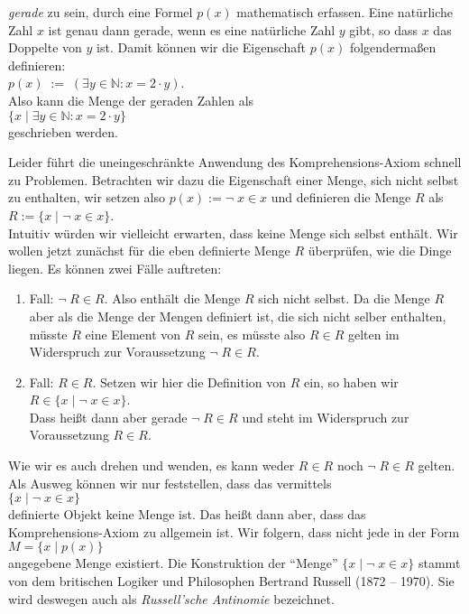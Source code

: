 \emph{gerade} zu sein, durch eine Formel $p(x)$ mathematisch erfassen.  Eine nat\"{u}rliche Zahl $x$ ist
genau dann gerade, wenn es eine nat\"{u}rliche Zahl $y$ gibt, so dass $x$ das Doppelte von $y$
ist.  Damit k\"{o}nnen wir die Eigenschaft $p(x)$ folgendermaßen
definieren: \\[0.2cm]
\hspace*{1.3cm} $p(x) \;:=\; (\exists y\in \mathbb{N}: x = 2 \cdot y)$. \\[0.2cm]
Also kann die Menge der geraden Zahlen als \\[0.2cm]
\hspace*{1.3cm} $\{ x \;|\; \exists y\in \mathbb{N}: x = 2 \cdot y \}$ \\[0.2cm]
geschrieben werden.

Leider f\"{u}hrt die uneingeschr\"{a}nkte Anwendung des Komprehensions-Axiom schnell zu
Problemen.  Betrachten wir dazu die Eigenschaft einer Menge, sich nicht selbst zu enthalten, wir
setzen also $p(x) := \neg\; x \in x$ und definieren die Menge $R$ als \\[0.2cm]
\hspace*{1.3cm} $R := \{ x \;|\; \neg\; x \in x \}$.  \\[0.2cm]
Intuitiv w\"{u}rden wir vielleicht erwarten, dass keine Menge sich selbst enth\"{a}lt.  Wir wollen
jetzt zun\"{a}chst f\"{u}r die eben definierte Menge $R$ \"{u}berpr\"{u}fen, wie die Dinge liegen.
Es k\"{o}nnen zwei F\"{a}lle auftreten:
\begin{enumerate}
\item Fall: $\neg\; R \in R$. Also enth\"{a}lt die Menge $R$ sich nicht selbst.
      Da die Menge $R$ aber als die Menge der Mengen definiert ist, die sich nicht selber
      enthalten, m\"{u}sste $R$ eine Element von $R$ sein, es m\"{u}sste also
      $R \in R$ gelten im Widerspruch zur Voraussetzung $\neg\; R \in R$.
\item Fall: $R \in R$. Setzen wir hier die Definition von $R$ ein, so haben wir \\[0.2cm]
      \hspace*{1.3cm}  $R \in \{ x \;|\; \neg\; x \in x \}$. \\[0.2cm]
      Dass heißt dann aber gerade $\neg\; R \in R$ und steht im Widerspruch zur
      Voraussetzung $R \in R$.
\end{enumerate}
Wie wir es auch drehen und wenden, es kann weder $R \in R$ noch $\neg\; R \in R$ gelten. 
Als Ausweg k\"{o}nnen wir nur feststellen, dass das vermittels \\[0.2cm]
\hspace*{1.3cm} $\{ x \mid \neg\; x \in x \}$ \\[0.2cm]
definierte Objekt keine Menge ist.
Das heißt dann aber, dass das Komprehensions-Axiom
zu allgemein ist.  Wir folgern, dass nicht jede  in der Form \\[0.2cm]
\hspace*{1.3cm} $M = \{ x \mid p(x) \}$ \\[0.2cm]
angegebene Menge  existiert.  Die Konstruktion der ``Menge''
$\{x \mid \neg\; x \in x\}$ stammt von dem britischen Logiker und Philosophen Bertrand
Russell (1872 -- 1970).  Sie wird deswegen auch als \emph{Russell'sche Antinomie} bezeichnet.


